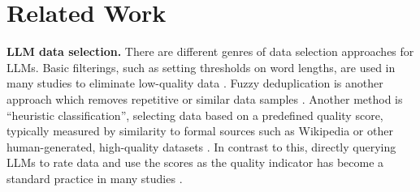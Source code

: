 \documentclass{article}
\begin{document}
\section{Related Work}\label{sec:RelatedWork}
\textbf{LLM data selection.} There are different genres of data selection approaches for LLMs. Basic filterings, such as setting thresholds on word lengths, are used in many studies to eliminate low-quality data \citep{soldaini2024dolma, wenzek2019ccnet, raffel2020exploring, conneau2019cross, penedo2023refinedweb, laurenccon2022bigscience}. Fuzzy deduplication is another approach which removes repetitive or similar data samples \citep{allamanis2019adverse, lee2021deduplicating, abbas2023semdedup, gao2020pile, jiang2022fuzzydedup}. Another method is  ``heuristic classification”, selecting data based on a predefined quality score, typically measured by similarity to formal sources such as Wikipedia or other human-generated, high-quality datasets \citep{brown2020language, touvron2023llama, chowdhery2023palm, du2022glam, gao2020pile, wenzek2019ccnet}. In contrast to this, directly querying LLMs to rate data and use the scores as the quality indicator has become a standard practice in many studies \citep{li2023quantity, chen2023alpagasus, bai2022constitutional, wettig2024qurating, yuan2024self, dubois2024alpacafarm, li2023alpacaeval, fernandes2023devil}.


\end{document}
